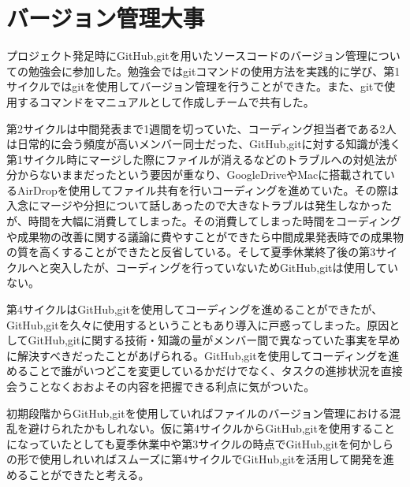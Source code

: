\section{バージョン管理大事}
プロジェクト発足時にGitHub,gitを用いたソースコードのバージョン管理についての勉強会に参加した。勉強会ではgitコマンドの使用方法を実践的に学び、第1サイクルではgitを使用してバージョン管理を行うことができた。また、gitで使用するコマンドをマニュアルとして作成しチームで共有した。
\par 第2サイクルは中間発表まで1週間を切っていた、コーディング担当者である2人は日常的に会う頻度が高いメンバー同士だった、GitHub,gitに対する知識が浅く第1サイクル時にマージした際にファイルが消えるなどのトラブルへの対処法が分からないままだったという要因が重なり、GoogleDriveやMacに搭載されているAirDropを使用してファイル共有を行いコーディングを進めていた。その際は入念にマージや分担について話しあったので大きなトラブルは発生しなかったが、時間を大幅に消費してしまった。その消費してしまった時間をコーディングや成果物の改善に関する議論に費やすことができたら中間成果発表時での成果物の質を高くすることができたと反省している。そして夏季休業終了後の第3サイクルへと突入したが、コーディングを行っていないためGitHub,gitは使用していない。
\par 第4サイクルはGitHub,gitを使用してコーディングを進めることができたが、GitHub,gitを久々に使用するということもあり導入に戸惑ってしまった。原因としてGitHub,gitに関する技術・知識の量がメンバー間で異なっていた事実を早めに解決すべきだったことがあげられる。GitHub,gitを使用してコーディングを進めることで誰がいつどこを変更しているかだけでなく、タスクの進捗状況を直接会うことなくおおよその内容を把握できる利点に気がついた。
\par  初期段階からGitHub,gitを使用していればファイルのバージョン管理における混乱を避けられたかもしれない。仮に第4サイクルからGitHub,gitを使用することになっていたとしても夏季休業中や第3サイクルの時点でGitHub,gitを何かしらの形で使用しれいればスムーズに第4サイクルでGitHub,gitを活用して開発を進めることができたと考える。
